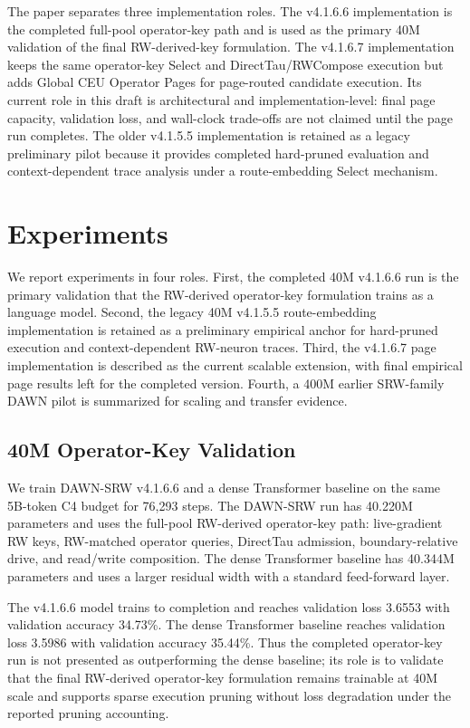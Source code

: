 \documentclass{article}
\begin{document}
The paper separates three implementation roles. The v4.1.6.6 implementation is the completed full-pool operator-key path and is used as the primary 40M validation of the final RW-derived-key formulation. The v4.1.6.7 implementation keeps the same operator-key Select and DirectTau/RWCompose execution but adds Global CEU Operator Pages for page-routed candidate execution. Its current role in this draft is architectural and implementation-level: final page capacity, validation loss, and wall-clock trade-offs are not claimed until the page run completes. The older v4.1.5.5 implementation is retained as a legacy preliminary pilot because it provides completed hard-pruned evaluation and context-dependent trace analysis under a route-embedding Select mechanism.

\section{Experiments}
\label{sec:experiments}

We report experiments in four roles. First, the completed 40M v4.1.6.6 run is the primary validation that the RW-derived operator-key formulation trains as a language model. Second, the legacy 40M v4.1.5.5 route-embedding implementation is retained as a preliminary empirical anchor for hard-pruned execution and context-dependent RW-neuron traces. Third, the v4.1.6.7 page implementation is described as the current scalable extension, with final empirical page results left for the completed version. Fourth, a 400M earlier SRW-family DAWN pilot is summarized for scaling and transfer evidence.

\subsection{40M Operator-Key Validation}
\label{sec:operator_key_results}

We train DAWN-SRW v4.1.6.6 and a dense Transformer baseline on the same 5B-token C4 budget for 76{,}293 steps. The DAWN-SRW run has 40.220M parameters and uses the full-pool RW-derived operator-key path: live-gradient RW keys, RW-matched operator queries, DirectTau admission, boundary-relative drive, and read/write composition. The dense Transformer baseline has 40.344M parameters and uses a larger residual width with a standard feed-forward layer.

The v4.1.6.6 model trains to completion and reaches validation loss 3.6553 with validation accuracy 34.73\%. The dense Transformer baseline reaches validation loss 3.5986 with validation accuracy 35.44\%. Thus the completed operator-key run is not presented as outperforming the dense baseline; its role is to validate that the final RW-derived operator-key formulation remains trainable at 40M scale and supports sparse execution pruning without loss degradation under the reported pruning accounting.
\end{document}
